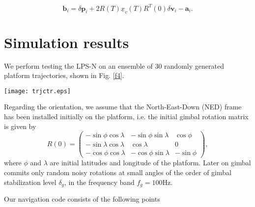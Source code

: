\documentclass[twocolumn,showpacs,preprintnumbers]{revtex4}
\begin{document}
\begin{equation}
\mathbf{b}_{i}=\delta \mathbf{p}_{i}+2R\left( T\right) \underline{x}%
_{v}\left( T\right) R^{T}\left( 0\right) \delta \mathbf{v}_{i}-\mathbf{a}%
_{i}.  \label{65}
\end{equation}

\section{\label{s5}Simulation results}

We perform testing the LPS-N on an ensemble of 30 randomly generated
platform trajectories, shown in Fig. \ref{f4}.

\begin{figure*}[t]
\texttt{[image: trjctr.eps]}
\caption{Platform trajectories. Platform
moves along each trajectory during the time $t_{n}=1$hour. The trajectories
are chosen so that the platform velocity $V\left( 0\right) =V\left(
t_{n}\right) =0\ $and it reaches a maximum at $t=t_{n}/2$. Only those
trajectories were selected for which $V\left( t_{n}/2\right) \in \left[ 200%
\text{m/s,}240\text{m/s}\right] $. (a) Trajectories latitudes and
longitudes. (b) Time dependences of the platform trajectories' altitudes.
(The trajectories were randomly generated in the western part of the Earth
northern hemisphere for the sole purpose that they were visible in Fig. 
\protect\ref{f4}a) \label{f4}  }
\end{figure*}

Regarding the orientation, we assume that the North-East-Down (NED) frame
has been installed initially on the platform, i.e. the initial gimbal
rotation matrix is given by%
\begin{equation}
R\left( 0\right) =\left( 
\begin{array}{ccc}
-\sin \phi \cos \lambda & -\sin \phi \sin \lambda & \cos \phi \\ 
-\sin \lambda \cos \lambda & \cos \lambda & 0 \\ 
-\cos \phi \cos \lambda & -\cos \phi \sin \lambda & -\sin \phi%
\end{array}%
\right) ,  \label{66}
\end{equation}%
where $\phi $ and $\lambda $ are initial latitudes and longitude of the
platform. Later on gimbal commits only random noisy rotations at small
angles of the order of gimbal stabilization level $\delta _{g}$, in the
frequency band $f_{g}=100$Hz.

Our navigation code consists of the following points
\end{document}
